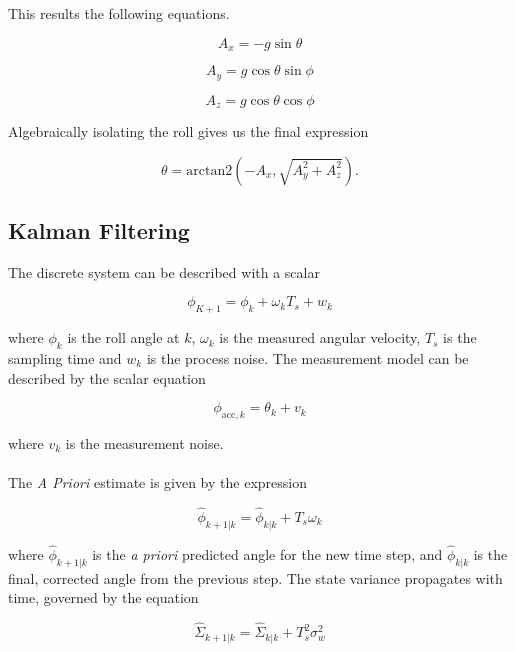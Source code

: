 \documentclass{article}
\begin{document}
This results the following equations.

\begin{equation}
A_x = -g\sin\theta
\end{equation}

\begin{equation}
A_y = g\cos\theta\sin\phi
\end{equation}

\begin{equation}
A_z = g\cos\theta\cos\phi
\end{equation}

Algebraically isolating the roll gives us the final expression

\begin{equation}
\theta = \text{arctan2}\left(-A_x, \sqrt{A_y^2 + A_z^2}\right).
\end{equation}

\subsection{Kalman Filtering}
The discrete system can be described with a scalar

\begin{equation}
    \phi_{K+1} = \phi_k + \omega_kT_s + w_k
\end{equation}

where $\phi_k$ is the roll angle at $k$, $\omega_k$ is the measured angular velocity, $T_s$ is the sampling time and $w_k$ is the process noise. The measurement model can be described by the scalar equation

\begin{equation}
    \phi_{\text{acc}, k} = \theta_k + v_k
\end{equation}

where $v_k$ is the measurement noise.\\
\\

The \textit{A Priori} estimate is given by the expression

\begin{equation}
    \hat\phi_{k+1|k} = \hat\phi_{k|k} + T_s\omega_k
\end{equation}

where $\hat\phi_{k+1|k}$ is the \textit{a priori} predicted angle for the new time step, and $\hat\phi_{k|k}$ is the final, corrected angle from the previous step. The state variance propagates with time, governed by the equation

\begin{equation}
\hat{\Sigma}_{k+1|k} = \hat{\Sigma}_{k|k} + T_{s}^{2}\sigma_{w}^{2}
\end{equation}
\end{document}
